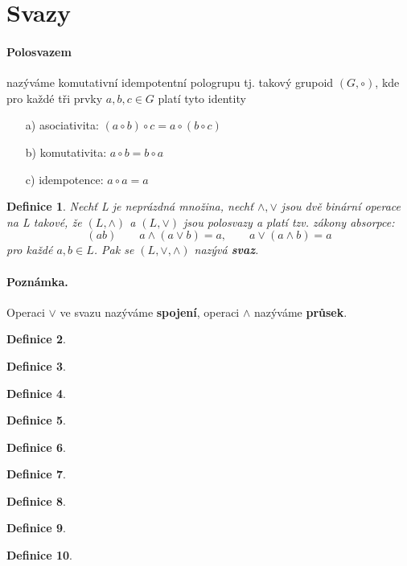 \documentclass[12pt,a4paper]{article}
\newtheorem{definition}{Definice}
\begin{document}
\section{Svazy}

\paragraph{Polosvazem} nazýváme komutativní idempotentní pologrupu tj. takový grupoid $(G, \circ)$, kde pro každé tři prvky $a,b,c \in G$ platí tyto identity  
\begin{itemize}
	\item[a)] asociativita: $(a \circ b) \circ c = a \circ (b \circ c)$
	\item[b)] komutativita: $a \circ b = b \circ a$
	\item[c)] idempotence: $a \circ a = a$
\end{itemize}

\begin{definition}
	Nechť L je neprázdná množina, nechť $\wedge, \vee$ jsou dvě binární operace na L takové, že $(L, \wedge)$ a $(L, \vee)$ jsou polosvazy a platí tzv. zákony absorpce:
	$$(ab) \qquad a \wedge (a \vee b) = a, \qquad a \vee (a \wedge b) = a$$
	pro každé $a,b \in L$. Pak se $(L, \vee, \wedge)$ nazývá \textbf{svaz}.
\end{definition}

\paragraph{Poznámka.} Operaci $\vee$ ve svazu nazýváme \textbf{spojení}, operaci $\wedge$ nazýváme \textbf{průsek}.
\begin{definition}\end{definition}
\begin{definition}\end{definition}
\begin{definition}\end{definition}
\begin{definition}\end{definition}
\begin{definition}\end{definition}
\begin{definition}\end{definition}
\begin{definition}\end{definition}
\begin{definition}\end{definition}
\begin{definition}\end{definition}
\end{document}
